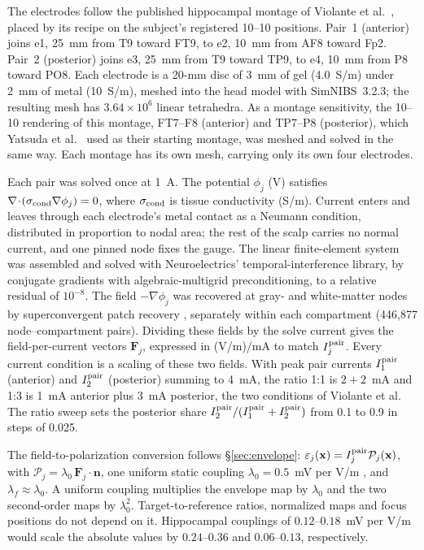 \documentclass[11pt,a4paper]{article}
\begin{document}
The electrodes follow the published hippocampal montage of Violante et al.\
\cite{violante2023}, placed by its recipe on the subject's registered 10--10
positions. Pair~1 (anterior) joins e1, 25~mm from T9 toward FT9, to e2, 10~mm from AF8
toward Fp2. Pair~2 (posterior) joins e3, 25~mm from T9 toward TP9, to e4, 10~mm from P8
toward PO8. Each electrode is a 20-mm disc of 3~mm of gel (4.0~S/m) under 2~mm of metal
(10~S/m), meshed into the head model with SimNIBS~3.2.3; the resulting mesh has
$3.64\times10^6$ linear tetrahedra. As a montage sensitivity, the 10--10 rendering of
this montage, FT7--F8 (anterior) and TP7--P8 (posterior), which Yatsuda et al.\
\cite{yatsuda2024} used as their starting montage, was meshed and solved in the same
way. Each montage has its own mesh, carrying only its own four electrodes.

Each pair was solved once at 1~A. The potential $\phi_j$ (V) satisfies
$\nabla\!\cdot\!(\sigma_{\rm cond}\nabla\phi_j)=0$, where
$\sigma_{\rm cond}$ is tissue conductivity (S/m). Current enters and leaves through each
electrode's metal contact as a Neumann condition, distributed in proportion to nodal
area; the rest of the scalp carries no normal current, and one pinned node fixes the
gauge. The linear finite-element system was assembled and solved with Neuroelectrics'
temporal-interference library, by conjugate gradients with algebraic-multigrid
preconditioning, to a relative residual of $10^{-8}$. The field
$-\nabla\phi_j$ was recovered at gray- and white-matter
nodes by superconvergent patch recovery \cite{zienkiewicz1992}, separately within each
compartment (446{,}877 node--compartment pairs). Dividing these fields by the solve
current gives the field-per-current vectors $\mathbf F_j$, expressed in
(V/m)/mA to match $I_j^{\rm pair}$. Every current condition is a scaling of these two fields.
With peak pair currents $I_1^{\rm pair}$ (anterior) and
$I_2^{\rm pair}$ (posterior) summing to 4~mA, the ratio 1:1 is $2+2$~mA and 1:3 is
1~mA anterior plus 3~mA posterior, the two conditions of Violante et al. The ratio sweep
sets the posterior share $I_2^{\rm pair}/(I_1^{\rm pair}+I_2^{\rm pair})$ from 0.1 to
0.9 in steps of 0.025.

The field-to-polarization conversion follows \S\ref{sec:envelope}:
$\varepsilon_j(\mathbf x)=I_j^{\rm pair}\mathcal P_j(\mathbf x)$, with
$\mathcal P_j=\lambda_0\,\mathbf F_j\!\cdot\!\mathbf n$, one uniform
static coupling $\lambda_0=0.5$~mV per V/m \cite{radman2009}, and
$\lambda_f\approx\lambda_0$. A uniform coupling multiplies the envelope map by
$\lambda_0$ and the two second-order maps by $\lambda_0^2$. Target-to-reference ratios,
normalized maps and focus positions do not depend on it. Hippocampal couplings of
$0.12$--$0.18$~mV per V/m \cite{bikson2004,deans2007} would scale the absolute values
by $0.24$--$0.36$ and $0.06$--$0.13$, respectively.
\end{document}
